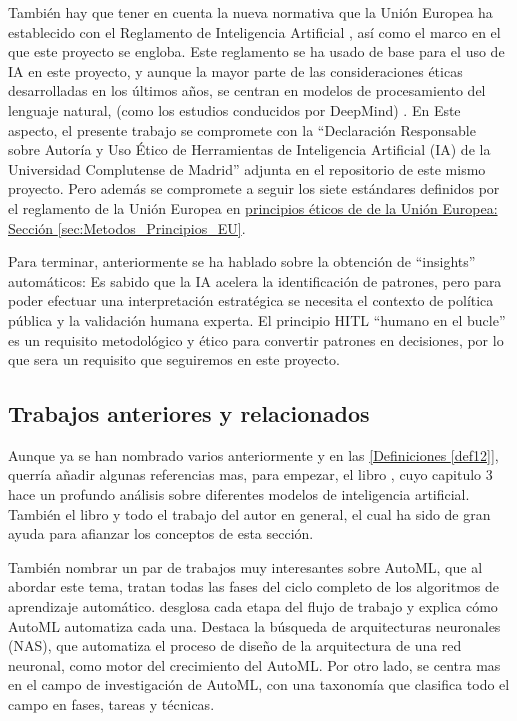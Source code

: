 También hay que tener en cuenta la nueva normativa que la Unión Europea ha establecido con el Reglamento de Inteligencia Artificial \citep{webRIA2024Europa}, así como el marco en el que este proyecto se engloba. Este reglamento se ha usado de base para el uso de IA en este proyecto, y aunque la mayor parte de las consideraciones éticas desarrolladas en los últimos años, se centran en modelos de procesamiento del lenguaje natural, (como los estudios conducidos por DeepMind) \citep{gabriel2024ethicsadvancedaiassistants}. En Este aspecto, el presente trabajo se compromete con la ``Declaración Responsable sobre Autoría y Uso Ético de Herramientas de Inteligencia Artificial (IA) de la Universidad Complutense de Madrid'' adjunta en el repositorio de este mismo proyecto. Pero además se compromete a seguir los siete estándares definidos por el reglamento de la Unión Europea en \hyperref[sec:Metodos_Principios_EU]{principios éticos de de la Unión Europea: Sección \ref*{sec:Metodos_Principios_EU}}.

Para terminar, anteriormente se ha hablado sobre la obtención de ``insights'' automáticos: Es sabido que la IA acelera la identificación de patrones, pero para poder efectuar una interpretación estratégica se necesita el contexto de política pública y la validación humana experta. El principio HITL ``humano en el bucle'' \citep{MosqueiraRey2023} es un requisito metodológico y ético para convertir patrones en decisiones, por lo que sera un requisito que seguiremos en este proyecto.


\subsection{Trabajos anteriores y relacionados}
	
	Aunque ya se han nombrado varios anteriormente y en las \hyperref[def12]{[Definiciones \ref*{def12}]}, querría añadir algunas referencias mas, para empezar, el libro \citep{Fowdur2021}, cuyo capitulo 3 hace un profundo análisis sobre diferentes modelos de inteligencia artificial. También el libro \citep{Brownlee_2016_MMLA} y todo el trabajo del autor en general, el cual ha sido de gran ayuda para afianzar los conceptos de esta sección.

	También nombrar un par de trabajos muy interesantes sobre AutoML, que al abordar este tema, tratan todas las fases del ciclo completo de los algoritmos de aprendizaje automático. \citep{SALEHIN202452} desglosa cada etapa del flujo de trabajo y explica cómo AutoML automatiza cada una. Destaca la búsqueda de arquitecturas neuronales (NAS), que automatiza el proceso de diseño de la arquitectura de una red neuronal, como motor del crecimiento del AutoML. Por otro lado, \citep{Barbudo2023} se centra mas en el campo de investigación de AutoML, con una taxonomía que clasifica todo el campo en fases, tareas y técnicas.
	
